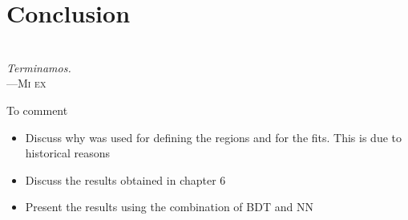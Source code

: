 \begin{comment}
%
%
asdf
\end{comment}

\chapter{Conclusion}

\label{chap:Conclusion}
\vspace*{0.1 cm} 
\hspace*{200pt} \\
\hspace*{175pt} \textit{Terminamos.} \\
\hspace*{200 pt}     ---\textsc{Mi ex} \\%
\vspace*{2cm} 


To comment
\begin{itemize}
	\item Discuss why \tHq was used for defining the regions and \tH 
	for the fits. This is due to historical reasons
	\item Discuss the results obtained in chapter 6
	\item Present the results using the combination of BDT and NN
\end{itemize}


\begin{comment}
asdf
%
\end{comment}
